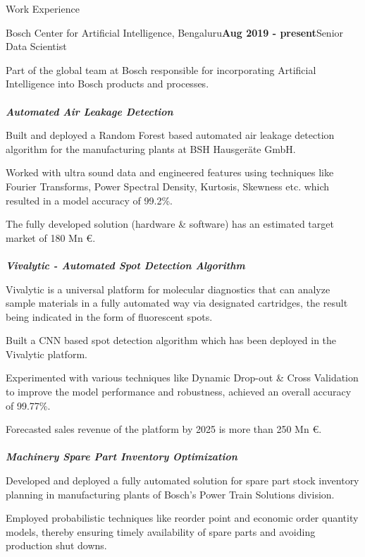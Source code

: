 \documentclass{resume}
\begin{document}
\begin{rSection}{Work Experience}
\begin{rSubsection}{Bosch Center for Artificial Intelligence, Bengaluru}{\textbf{Aug 2019 - present}}{Senior Data Scientist}{}

 \item Part of the global team at Bosch responsible for incorporating Artificial Intelligence into Bosch products and processes.\\\\
{\textbf{\textit{Automated Air Leakage Detection}}}
 \item Built and deployed a Random Forest based automated air leakage detection algorithm for the manufacturing plants at BSH Hausgeräte GmbH.
 \item Worked with ultra sound data and engineered features using techniques like Fourier Transforms, Power Spectral Density, Kurtosis, Skewness etc. which resulted in a model accuracy of 99.2\%.
 \item The fully developed solution (hardware \& software) has an estimated target market of 180 Mn \euro{}.\\\\
{\textbf{\textit{Vivalytic - Automated Spot Detection Algorithm}}}
 \item Vivalytic is a universal platform for molecular diagnostics that can analyze sample materials in a fully automated way via designated cartridges, the result being indicated in the form of fluorescent spots.
 \item Built a CNN based spot detection algorithm which has been deployed in the Vivalytic platform.
 \item Experimented with various techniques like Dynamic Drop-out \& Cross Validation to improve the model performance and robustness, achieved an overall accuracy of 99.77\%.
 \item Forecasted sales revenue of the platform by 2025 is more than 250 Mn \euro{}.\\\\
{\textbf{\textit{Machinery Spare Part Inventory Optimization}}}
 \item Developed and deployed a fully automated solution for spare part stock inventory planning in manufacturing plants of Bosch's Power Train Solutions division.
  \item Employed probabilistic techniques like reorder point and economic order quantity models, thereby ensuring timely availability of spare parts and avoiding production shut downs.

\end{rSubsection}
\end{rSection}
\end{document}
